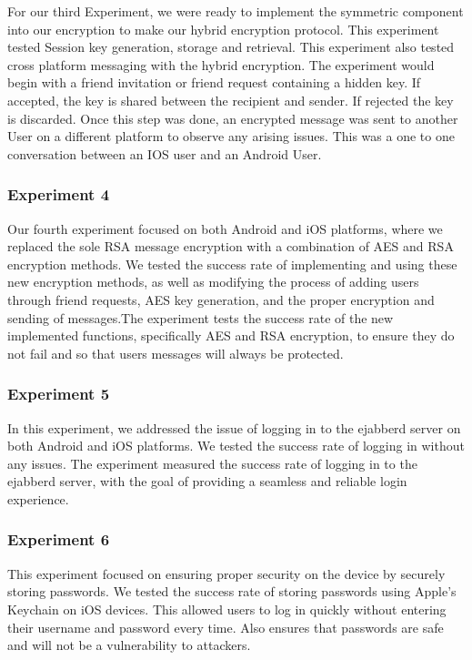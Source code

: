 \documentclass[12pt]{article}
\begin{document}
For our third Experiment, we were ready to implement the symmetric component into our encryption to make our hybrid encryption protocol. This experiment tested Session key generation, storage and retrieval. This experiment also tested cross platform messaging with the hybrid encryption. The experiment would begin with a friend invitation or friend request containing a hidden key. If accepted, the key is shared between the recipient and sender. If rejected the key is discarded. Once this step was done, an encrypted message was sent to another User on a different platform to observe any arising issues. This was a one to one conversation between an IOS user and an Android User. 

\subsubsection{Experiment 4}
Our fourth experiment focused on both Android and iOS platforms, where we replaced the sole RSA message encryption with a combination of AES and RSA encryption methods. We tested the success rate of implementing and using these new encryption methods, as well as modifying the process of adding users through friend requests, AES key generation, and the proper encryption and sending of messages.The experiment tests the success rate of the new implemented functions, specifically AES and RSA encryption, to ensure they do not fail and so that users messages will always be protected.

\subsubsection{Experiment 5}
In this experiment, we addressed the issue of logging in to the ejabberd server on both Android and iOS platforms. We tested the success rate of logging in without any issues. The experiment measured the success rate of logging in to the ejabberd server, with the goal of providing a seamless and reliable login experience.

\subsubsection{Experiment 6}

This experiment focused on ensuring proper security on the device by securely storing passwords. We tested the success rate of storing passwords using Apple's Keychain on iOS devices. This allowed users to log in quickly without entering their username and password every time. Also ensures that passwords are safe and will not be a vulnerability to attackers.
\end{document}
